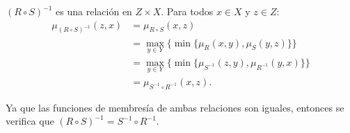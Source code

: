 
\((R\circ S)^{-1}\) es una relación en \(Z × X\).
Para todos \(x ∈ X\) y \(z ∈ Z\):
\begin{align*}
     μ_{(R\circ S)^{-1}}(z, x)
  &= μ_{R\circ S}(x, z) \\
  &= \max_{y ∈ Y}\bigl\{
       \min\{
         μ_R(x, y),
         μ_S(y, z)
       \}
     \bigr\} \\
  &= \max_{y ∈ Y}\bigl\{
       \min\{
         μ_{S^{-1}}(z, y),
         μ_{R^{-1}}(y, x)
       \}
     \bigr\} \\
  &= μ_{S^{-1}\circ R^{-1}}(x, z).
\end{align*}

Ya que las funciones de membresía de ambas relaciones son iguales,
entonces se verifica que \((R\circ S)^{-1} = S^{-1}\circ R^{-1}\).

